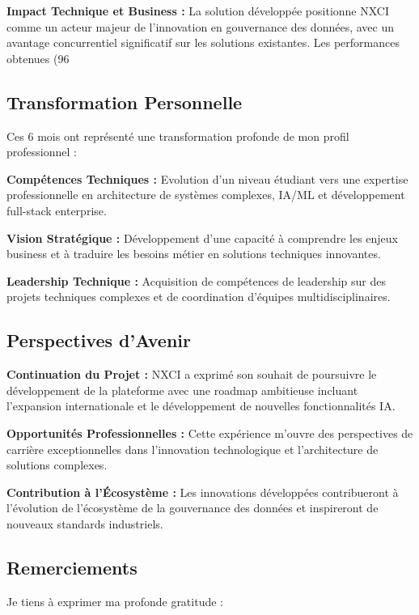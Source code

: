 \documentclass[a4paper,12pt]{article}
\begin{document}
\textbf{Impact Technique et Business :}
La solution développée positionne NXCI comme un acteur majeur de l'innovation en gouvernance des données, avec un avantage concurrentiel significatif sur les solutions existantes. Les performances obtenues (96%

\subsection{Transformation Personnelle}

Ces 6 mois ont représenté une transformation profonde de mon profil professionnel :

\textbf{Compétences Techniques :} Evolution d'un niveau étudiant vers une expertise professionnelle en architecture de systèmes complexes, IA/ML et développement full-stack enterprise.

\textbf{Vision Stratégique :} Développement d'une capacité à comprendre les enjeux business et à traduire les besoins métier en solutions techniques innovantes.

\textbf{Leadership Technique :} Acquisition de compétences de leadership sur des projets techniques complexes et de coordination d'équipes multidisciplinaires.

\subsection{Perspectives d'Avenir}

\textbf{Continuation du Projet :}
NXCI a exprimé son souhait de poursuivre le développement de la plateforme avec une roadmap ambitieuse incluant l'expansion internationale et le développement de nouvelles fonctionnalités IA.

\textbf{Opportunités Professionnelles :}
Cette expérience m'ouvre des perspectives de carrière exceptionnelles dans l'innovation technologique et l'architecture de solutions complexes.

\textbf{Contribution à l'Écosystème :}
Les innovations développées contribueront à l'évolution de l'écosystème de la gouvernance des données et inspireront de nouveaux standards industriels.

\subsection{Remerciements}

Je tiens à exprimer ma profonde gratitude :
\end{document}
